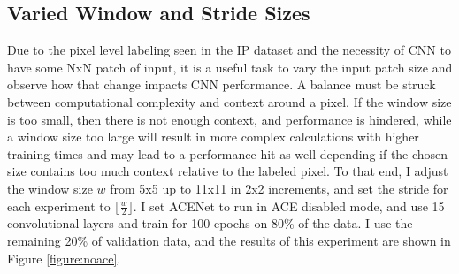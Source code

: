 \documentclass[12pt]{article}
\begin{document}
\subsection{Varied Window and Stride Sizes}
Due to the pixel level labeling seen in the IP dataset and the necessity of CNN to have some NxN patch of input, it is a useful task to vary the input patch size and observe how that change impacts CNN performance. 
%
A balance must be struck between computational complexity and context around a pixel.
%
If the window size is too small, then there is not enough context, and performance is hindered, while a window size too large will result in more complex calculations with higher training times and may lead to a performance hit as well depending if the chosen size contains too much context relative to the labeled pixel.
%
To that end, I adjust the window size $w$ from 5x5 up to 11x11 in 2x2 increments, and set the stride for each experiment to $\lfloor\frac{w}{2}\rfloor$. 
%
I set ACENet to run in ACE disabled mode, and use 15 convolutional layers and train for 100 epochs on 80\% of the data.
%
I use the remaining 20\% of validation data, and the results of this experiment are shown in Figure \ref{figure:noace}.
\end{document}
